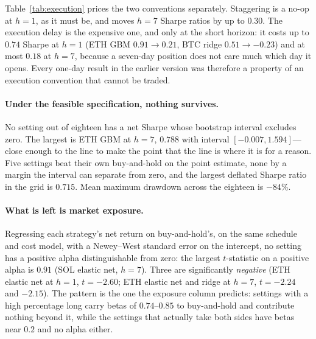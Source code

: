 \documentclass{article}
\theoremstyle{plain}
\theoremstyle{definition}
\begin{document}
Table~\ref{tab:execution} prices the two conventions separately. Staggering is a no-op at
$h=1$, as it must be, and moves $h=7$ Sharpe ratios by up to $0.30$. The execution delay is
the expensive one, and only at the short horizon: it costs up to $0.74$ Sharpe at $h=1$
(ETH GBM $0.91\to0.21$, BTC ridge $0.51\to-0.23$) and at most $0.18$ at $h=7$, because a
seven-day position does not care much which day it opens. Every one-day result in the earlier
version was therefore a property of an execution convention that cannot be traded.

\paragraph{Under the feasible specification, nothing survives.} No setting out of eighteen
has a net Sharpe whose bootstrap interval excludes zero. The largest is ETH GBM at $h=7$,
$0.788$ with interval $[-0.007, 1.594]$---close enough to the line to make the point that the
line is where it is for a reason. Five settings beat their own buy-and-hold on the point
estimate, none by a margin the interval can separate from zero, and the largest deflated
Sharpe ratio in the grid is $0.715$. Mean maximum drawdown across the eighteen is $-84\%$.

\paragraph{What is left is market exposure.} Regressing each strategy's net return on
buy-and-hold's, on the same schedule and cost model, with a Newey--West standard error on the
intercept, no setting has a positive alpha distinguishable from zero: the largest $t$-statistic
on a positive alpha is $0.91$ (SOL elastic net, $h=7$). Three are significantly \emph{negative}
(ETH elastic net at $h=1$, $t=-2.60$; ETH elastic net and ridge at $h=7$, $t=-2.24$ and
$-2.15$). The pattern is the one the exposure column predicts: settings with a high percentage
long carry betas of $0.74$--$0.85$ to buy-and-hold and contribute nothing beyond it, while the
settings that actually take both sides have betas near $0.2$ and no alpha either.
\end{document}
